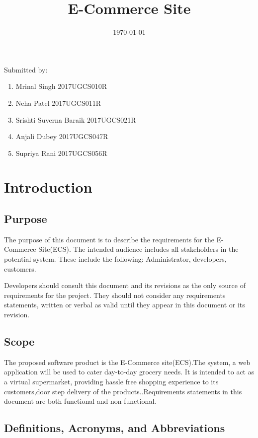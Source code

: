\documentclass{article}
\title{E-Commerce Site}
\date{\today}
\begin{document}
	\maketitle
Submitted by:
\begin{enumerate}
\item Mrinal Singh 2017UGCS010R
\item Neha Patel 2017UGCS011R
\item Srishti Suverna Baraik 2017UGCS021R
\item Anjali Dubey 2017UGCS047R
\item Supriya Rani 2017UGCS056R
\end{enumerate}
	\newpage
\tableofcontents
	\newpage
	\section{Introduction}
	
	\subsection{Purpose}
	The purpose of this document is to describe the requirements for the E-Commerce Site(ECS).  The intended audience includes all stakeholders in the potential system. These include  the following: Administrator, developers, customers.

           Developers should consult this document and its revisions as the only source of requirements for the project. They should not consider any requirements statements, written or verbal as valid until they appear in this document or its revision.

\subsection{Scope}
  The proposed software product is the E-Commerce site(ECS).The system, a web application will be used to cater day-to-day grocery needs. It is intended to act as a  virtual supermarket, providing hassle free shopping experience to its customers,door step delivery of the products..Requirements statements in this document are both functional and non-functional.
\subsection{Definitions, Acronyms, and Abbreviations }
  
\end{document}
